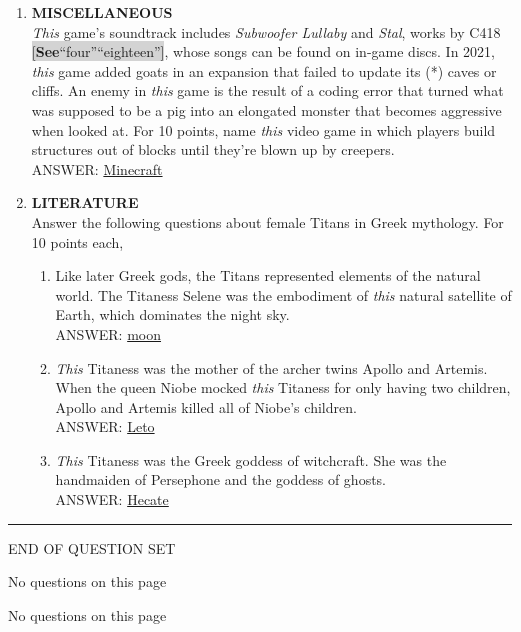 \documentclass{report}
\newcommand*{\backtrack}{\setcounter{enumi}{\numexpr\theenumi-1\relax}}
\begin{document}
\begin{enumerate}
    \item \textbf{MISCELLANEOUS} \\ \textit{This} game’s soundtrack includes \textit{Subwoofer Lullaby} and \textit{Stal}, works by C418 \colorbox{lightGray}{[\textbf{See}\textperiodcentered ``four''\textperiodcentered ``eighteen'']}, whose songs can be found on in-game discs. In 2021, \textit{this} game added goats in an expansion that failed to update its (*) caves or cliffs. An enemy in \textit{this} game is the result of a coding error that turned what was supposed to be a pig into an elongated monster that becomes aggressive when looked at. For 10 points, name \textit{this} video game in which players build structures out of blocks until they’re blown up by creepers. \\ ANSWER: \underline{Minecraft} \backtrack
    \item \textbf{LITERATURE} \\ Answer the following questions about female Titans in Greek mythology. For 10 points each,
    \begin{enumerate}[label=\Alph*]
        \item Like later Greek gods, the Titans represented elements of the natural world. The Titaness Selene was the embodiment of \textit{this} natural satellite of Earth, which dominates the night sky. \\ ANSWER: \underline{moon}
        \item \textit{This} Titaness was the mother of the archer twins Apollo and Artemis. When the queen Niobe mocked \textit{this} Titaness for only having two children, Apollo and Artemis killed all of Niobe’s children. \\ ANSWER: \underline{Leto}
        \item \textit{This} Titaness was the Greek goddess of witchcraft. She was the handmaiden of Persephone and the goddess of ghosts. \\ ANSWER: \underline{Hecate}
    \end{enumerate}

    
\end{enumerate}


\vspace*{0.5 cm}
\centering
\rule{10 cm}{0.4pt}

\Large
END OF QUESTION SET
\newpage

\vspace*{\fill}
\centering
\thispagestyle{empty}
\Large
No questions on this page
\vspace*{\fill}

\newpage

\vspace*{\fill}
\centering
\thispagestyle{empty}
\Large
No questions on this page
\vspace*{\fill}
\end{document}
